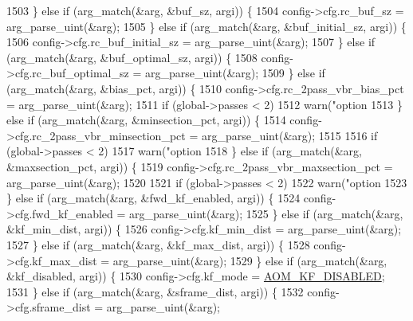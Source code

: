 \begin{DoxyCodeInclude}
{{{{{{{{{{{{{{{{{1503     \} \textcolor{keywordflow}{else} \textcolor{keywordflow}{if} (arg\_match(&arg, &buf\_sz, argi)) \{
1504       config->cfg.rc\_buf\_sz = arg\_parse\_uint(&arg);
1505     \} \textcolor{keywordflow}{else} \textcolor{keywordflow}{if} (arg\_match(&arg, &buf\_initial\_sz, argi)) \{
1506       config->cfg.rc\_buf\_initial\_sz = arg\_parse\_uint(&arg);
1507     \} \textcolor{keywordflow}{else} \textcolor{keywordflow}{if} (arg\_match(&arg, &buf\_optimal\_sz, argi)) \{
1508       config->cfg.rc\_buf\_optimal\_sz = arg\_parse\_uint(&arg);
1509     \} \textcolor{keywordflow}{else} \textcolor{keywordflow}{if} (arg\_match(&arg, &bias\_pct, argi)) \{
1510       config->cfg.rc\_2pass\_vbr\_bias\_pct = arg\_parse\_uint(&arg);
1511       \textcolor{keywordflow}{if} (global->passes < 2)
1512         warn(\textcolor{stringliteral}{"option %
1513     \} \textcolor{keywordflow}{else} \textcolor{keywordflow}{if} (arg\_match(&arg, &minsection\_pct, argi)) \{
1514       config->cfg.rc\_2pass\_vbr\_minsection\_pct = arg\_parse\_uint(&arg);
1515 
1516       \textcolor{keywordflow}{if} (global->passes < 2)
1517         warn(\textcolor{stringliteral}{"option %
1518     \} \textcolor{keywordflow}{else} \textcolor{keywordflow}{if} (arg\_match(&arg, &maxsection\_pct, argi)) \{
1519       config->cfg.rc\_2pass\_vbr\_maxsection\_pct = arg\_parse\_uint(&arg);
1520 
1521       \textcolor{keywordflow}{if} (global->passes < 2)
1522         warn(\textcolor{stringliteral}{"option %
1523     \} \textcolor{keywordflow}{else} \textcolor{keywordflow}{if} (arg\_match(&arg, &fwd\_kf\_enabled, argi)) \{
1524       config->cfg.fwd\_kf\_enabled = arg\_parse\_uint(&arg);
1525     \} \textcolor{keywordflow}{else} \textcolor{keywordflow}{if} (arg\_match(&arg, &kf\_min\_dist, argi)) \{
1526       config->cfg.kf\_min\_dist = arg\_parse\_uint(&arg);
1527     \} \textcolor{keywordflow}{else} \textcolor{keywordflow}{if} (arg\_match(&arg, &kf\_max\_dist, argi)) \{
1528       config->cfg.kf\_max\_dist = arg\_parse\_uint(&arg);
1529     \} \textcolor{keywordflow}{else} \textcolor{keywordflow}{if} (arg\_match(&arg, &kf\_disabled, argi)) \{
1530       config->cfg.kf\_mode = \hyperlink{group__encoder_ggac0498fc02cd368e6d9675cdb0bab5a84af81473ffe0169271763f9c9d05393405}{AOM\_KF\_DISABLED};
1531     \} \textcolor{keywordflow}{else} \textcolor{keywordflow}{if} (arg\_match(&arg, &sframe\_dist, argi)) \{
1532       config->cfg.sframe\_dist = arg\_parse\_uint(&arg);
}}}}}}}}}}}}}}}}}}}}
\end{DoxyCodeInclude}
